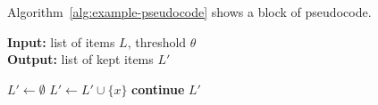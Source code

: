 \documentclass[11pt,english,listoffigures,listoftables, listofalgorithms]{tfgetsinf}
\begin{document}
Algorithm~\ref{alg:example-pseudocode} shows a block of pseudocode.

\begin{algorithm}[H]
\caption{Example of a pseudocode block}
\textbf{Input:} list of items $L$, threshold $\theta$ \\
\textbf{Output:} list of kept items $L'$
\begin{algorithmic}[1]
    \State $L' \gets \emptyset$
            \State $L' \gets L' \cup \{x\}$ 
        \Else
            \State \textbf{continue} 
        \EndIf
    \EndFor
    \State \Return $L'$
\EndProcedure
\end{algorithmic}
\label{alg:example-pseudocode}
\end{algorithm}

\end{document}
